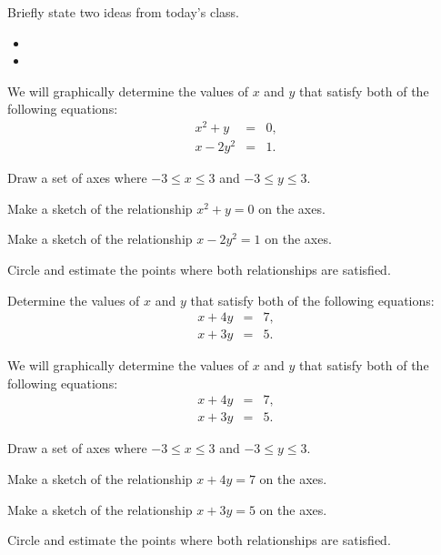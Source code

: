 \begin{problem}
\item Briefly state two ideas from today's class.
  \begin{itemize}
  \item 
  \item 
  \end{itemize}
\item We will graphically determine the values of $x$ and $y$ that
  satisfy both of the following equations:
  \begin{eqnarray*}
    x^2 + y  & = & 0, \\
    x - 2y^2 & = & 1.
  \end{eqnarray*}

  \begin{subproblem}
  \item Draw a set of axes where $-3\leq x \leq 3$ and $-3 \leq y \leq
    3$. 


    \vfill

  \item Make a sketch of the relationship $x^2+y=0$ on the axes.
  \item Make a sketch of the relationship $x-2y^2=1$ on the axes.
  \item Circle and estimate the points where both relationships are
    satisfied.
  \end{subproblem}
\clearpage
\item Determine the values of $x$ and $y$ that satisfy both of the
  following equations:
  \begin{eqnarray*}
    x + 4y & = & 7, \\
    x + 3y & = & 5.
  \end{eqnarray*}
  \clearpage
\item We will graphically determine the values of $x$ and $y$ that
  satisfy both of the following equations:
  \begin{eqnarray*}
    x + 4y & = & 7, \\
    x + 3y & = & 5.
  \end{eqnarray*}
  \begin{subproblem}
  \item Draw a set of axes where $-3\leq x \leq 3$ and $-3 \leq y \leq
    3$. 


    \vfill

  \item Make a sketch of the relationship $x+4y=7$ on the axes.
  \item Make a sketch of the relationship $x+3y=5$ on the axes.
  \item Circle and estimate the points where both relationships are
    satisfied.
  \end{subproblem}
\end{problem}


